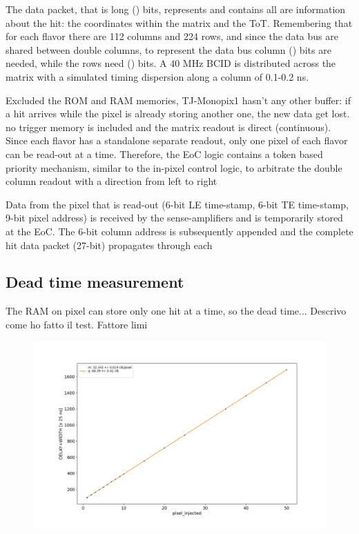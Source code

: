     The data packet, that is long () bits, represents and contains all are information about the hit: the coordinates within the matrix and the ToT. Remembering that for each flavor there are 112 columns and 224 rows, and since the data bus are shared between double columns, to represent the data bus column () bits are needed, while the rows need () bits. 
    A 40 MHz BCID is distributed across the matrix with a simulated timing dispersion along a column of 0.1-0.2 ns. 

    Excluded the ROM and RAM memories, TJ-Monopix1 hasn't any other buffer: if a hit arrives while the pixel is already storing another one, the new data get lost.
    no trigger memory is included and the matrix readout is direct (continuous). Since each flavor has a
    standalone separate readout, only one pixel of each flavor can be read-out at a time. Therefore, the
    EoC logic contains a token based priority mechanism, similar to the in-pixel control logic, to arbitrate
    the double column readout with a direction from left to right

    Data from the pixel that is read-out (6-bit LE time-stamp, 6-bit TE time-stamp, 9-bit pixel
    address) is received by the sense-amplifiers and is temporarily stored at the EoC. The 6-bit column
    address is subsequently appended and the complete hit data packet (27-bit) propagates through each


    \subsection{Dead time measurement}
        The RAM on pixel can store only one hit at a time, so the dead time...
        Descrivo come ho fatto il test. 
        Fattore limi
        \begin{figure}[h!]
                \centering
                \includegraphics[width=.7\linewidth]{figures/Monopix1/dead_time.png}
                \caption{}
                \label{fig:dead_time}
            \end{figure}

    
